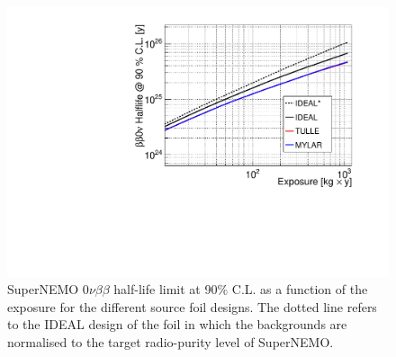 \documentclass[main.tex]{subfiles}
\begin{document}
\begin{figure}[h!]
\centering
\includegraphics[scale=0.55]{pictures/Chap4/SensVsExposure.pdf}
\caption{SuperNEMO 0$\nu\beta\beta$ half-life limit at 90\% C.L. as a function of the exposure for the different source foil designs. The dotted line refers to the IDEAL design of the foil in which the backgrounds are normalised to the target radio-purity level of SuperNEMO.}
\label{SensVsExposure3Designs}
\end{figure}
\end{document}
